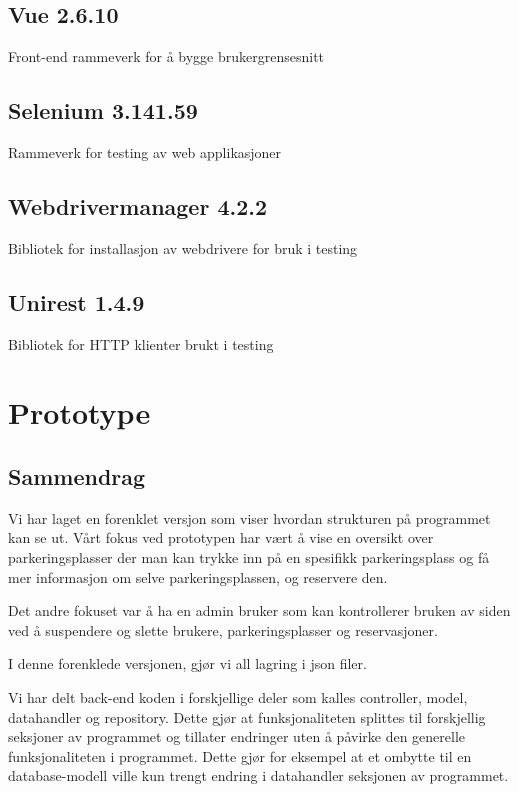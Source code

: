 \documentclass[12pt]{article}
\begin{document}
        \subsection{Vue 2.6.10}
        Front-end rammeverk for å bygge brukergrensesnitt

        \subsection{Selenium 3.141.59}
        Rammeverk for testing av web applikasjoner

        \subsection{Webdrivermanager 4.2.2}
        Bibliotek for installasjon av webdrivere for bruk i testing

        \subsection{Unirest 1.4.9}
        Bibliotek for HTTP klienter brukt i testing


\section{Prototype}

    \subsection{Sammendrag}
    Vi har laget en forenklet versjon som viser hvordan strukturen på programmet kan se ut. Vårt fokus ved prototypen har vært å vise en oversikt over parkeringsplasser der man kan trykke inn på en spesifikk parkeringsplass og få mer informasjon om selve parkeringsplassen, og reservere den. 

    Det andre fokuset var å ha en admin bruker som kan kontrollerer bruken av siden ved å suspendere og slette brukere, parkeringsplasser og reservasjoner.

    I denne forenklede versjonen, gjør vi all lagring i json filer.

    Vi har delt back-end koden i forskjellige deler som kalles controller, model, datahandler og repository. Dette gjør at funksjonaliteten splittes til forskjellig seksjoner av programmet og tillater endringer uten å påvirke den generelle funksjonaliteten i programmet. Dette gjør for eksempel at et ombytte til en database-modell ville kun trengt endring i datahandler seksjonen av programmet.
\end{document}
